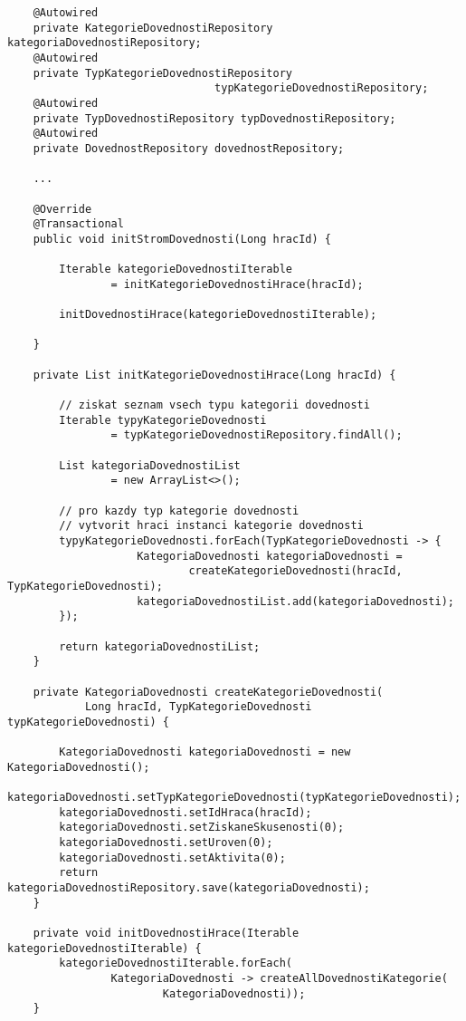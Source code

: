 \documentclass[twoside, 12pt]{article}
\begin{document}
{\begin{lstlisting}
    @Autowired
    private KategorieDovednostiRepository kategoriaDovednostiRepository;
    @Autowired
    private TypKategorieDovednostiRepository
                                typKategorieDovednostiRepository;
    @Autowired
    private TypDovednostiRepository typDovednostiRepository;
    @Autowired
    private DovednostRepository dovednostRepository;

    ...

    @Override
    @Transactional
    public void initStromDovednosti(Long hracId) {

        Iterable kategorieDovednostiIterable
                = initKategorieDovednostiHrace(hracId);

        initDovednostiHrace(kategorieDovednostiIterable);

    }

    private List initKategorieDovednostiHrace(Long hracId) {

        // ziskat seznam vsech typu kategorii dovednosti
        Iterable typyKategorieDovednosti
                = typKategorieDovednostiRepository.findAll();

        List kategoriaDovednostiList
                = new ArrayList<>();

        // pro kazdy typ kategorie dovednosti
        // vytvorit hraci instanci kategorie dovednosti
        typyKategorieDovednosti.forEach(TypKategorieDovednosti -> {
                    KategoriaDovednosti kategoriaDovednosti =
                            createKategorieDovednosti(hracId, TypKategorieDovednosti);
                    kategoriaDovednostiList.add(kategoriaDovednosti);
        });

        return kategoriaDovednostiList;
    }

    private KategoriaDovednosti createKategorieDovednosti(
            Long hracId, TypKategorieDovednosti typKategorieDovednosti) {

        KategoriaDovednosti kategoriaDovednosti = new KategoriaDovednosti();
        kategoriaDovednosti.setTypKategorieDovednosti(typKategorieDovednosti);
        kategoriaDovednosti.setIdHraca(hracId);
        kategoriaDovednosti.setZiskaneSkusenosti(0);
        kategoriaDovednosti.setUroven(0);
        kategoriaDovednosti.setAktivita(0);
        return kategoriaDovednostiRepository.save(kategoriaDovednosti);
    }

    private void initDovednostiHrace(Iterable kategorieDovednostiIterable) {
        kategorieDovednostiIterable.forEach(
                KategoriaDovednosti -> createAllDovednostiKategorie(
                        KategoriaDovednosti));
    }


\end{lstlisting}}
\end{document}
